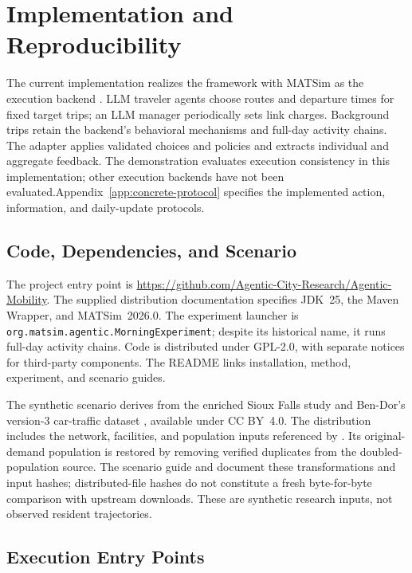 \section{Implementation and Reproducibility}
\label{sec:reproducibility}

The current implementation realizes the framework with MATSim as the execution backend \cite{horni2016matsim}. LLM traveler agents choose routes and departure times for fixed target trips; an LLM manager periodically sets link charges. Background trips retain the backend's behavioral mechanisms and full-day activity chains. The adapter applies validated choices and policies and extracts individual and aggregate feedback. The demonstration evaluates execution consistency in this
implementation; other execution backends have not been
evaluated.Appendix~\ref{app:concrete-protocol} specifies the implemented action, information, and daily-update protocols.

\subsection{Code, Dependencies, and Scenario}

The project entry point is \url{https://github.com/Agentic-City-Research/Agentic-Mobility}. The supplied distribution documentation specifies JDK~25, the Maven Wrapper, and MATSim~2026.0. The experiment launcher is \texttt{org.matsim.agentic.MorningExperiment}; despite its historical name, it runs full-day activity chains. Code is distributed under GPL-2.0, with separate notices for third-party components. The README links installation, method, experiment, and scenario guides.

The synthetic scenario derives from the enriched Sioux Falls study \cite{chakirov2014sioux} and Ben-Dor's version-3 car-traffic dataset \cite{ben-dorPopulationDownscalingMultiagent2021}, available under CC BY~4.0. The distribution includes the network, facilities, and population inputs referenced by . Its original-demand population is restored by removing verified duplicates from the doubled-population source. The scenario guide and  document these transformations and input hashes; distributed-file hashes do not constitute a fresh byte-for-byte comparison with upstream downloads. These are synthetic research inputs, not observed resident trajectories.


\subsection{Execution Entry Points}

